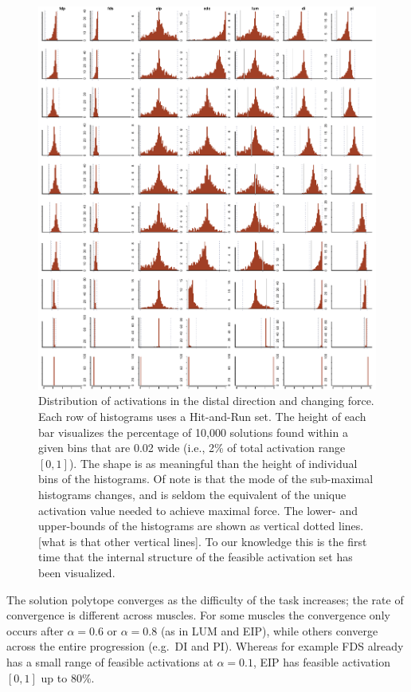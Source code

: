 \begin{figure}[htbp]
\centering
\includegraphics[width=\textwidth]{figs/Z_alphaProgression1430924065026.pdf}
\caption{Distribution of activations in the distal direction and changing force. Each row of histograms uses a Hit-and-Run set. The height of each bar visualizes the percentage of 10,000 solutions found within a given bins that are 0.02 wide (i.e., 2\% of total activation range $[0,1]$).  The shape is as meaningful than the height of individual bins of the histograms. Of note is that the mode of the sub-maximal histograms changes, and is seldom the equivalent of the unique activation value needed to achieve maximal force. The lower- and upper-bounds of the histograms are shown as  vertical dotted lines. [what is that other vertical lines]. To our knowledge this is the first time that the internal structure of the feasible activation set has been visualized.}
\label{fig:Z_progression}
\end{figure}

The solution polytope converges as the difficulty of the task increases; the rate of convergence is different across muscles.
For some muscles the convergence only occurs after $\alpha=0.6$ or $\alpha=0.8$ (as in LUM and EIP), while others converge across the entire progression (e.g.\ DI and PI).
Whereas for example FDS already has a small range of feasible activations at $\alpha=0.1$, EIP has feasible activation $[0,1]$ up to 80\%.

